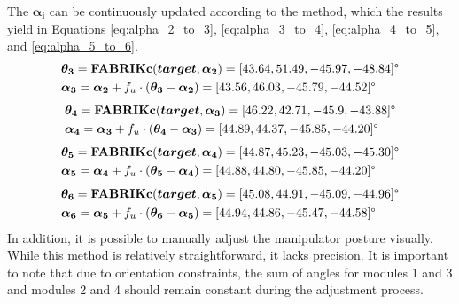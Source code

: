 The $\boldsymbol{\alpha_i}$ can be continuously updated according to the method, which the results yield in Equations 
\ref{eq:alpha_2_to_3}, \ref{eq:alpha_3_to_4}, \ref{eq:alpha_4_to_5}, and \ref{eq:alpha_5_to_6}.
\begin{align}
    &\boldsymbol{\theta_3} = \textbf{FABRIKc}(\boldsymbol{target}, \boldsymbol{\alpha_2}) 
    = [43.64, 51.49, -45.97, -48.84]\degree \nonumber \\
    &\boldsymbol{\alpha_3} = \boldsymbol{\alpha_2} + f_u \cdot (\boldsymbol{\theta_3} - \boldsymbol{\alpha_2}) 
    = [43.56, 46.03, -45.79, -44.52]\degree
    \label{eq:alpha_2_to_3}
\end{align}
\vspace{-18mm}
\begin{align}
    &\boldsymbol{\theta_4} = \textbf{FABRIKc}(\boldsymbol{target}, \boldsymbol{\alpha_3}) 
    = [46.22, 42.71, -45.9, -43.88]\degree \nonumber \\
    &\boldsymbol{\alpha_4} = \boldsymbol{\alpha_3} + f_u \cdot (\boldsymbol{\theta_4} - \boldsymbol{\alpha_3}) 
    = [44.89, 44.37, -45.85, -44.20]\degree
    \label{eq:alpha_3_to_4}
\end{align}
\vspace{-18mm}
\begin{align}
    &\boldsymbol{\theta_5} = \textbf{FABRIKc}(\boldsymbol{target}, \boldsymbol{\alpha_4}) 
    = [44.87, 45.23, -45.03, -45.30]\degree \nonumber \\
    &\boldsymbol{\alpha_5} = \boldsymbol{\alpha_4} + f_u \cdot (\boldsymbol{\theta_5} - \boldsymbol{\alpha_4}) 
    = [44.88, 44.80, -45.85, -44.20]\degree
    \label{eq:alpha_4_to_5}
\end{align}
\vspace{-18mm}
\begin{align}
    &\boldsymbol{\theta_6} = \textbf{FABRIKc}(\boldsymbol{target}, \boldsymbol{\alpha_5}) 
    = [45.08, 44.91, -45.09, -44.96]\degree \nonumber \\
    &\boldsymbol{\alpha_6} = \boldsymbol{\alpha_5} + f_u \cdot (\boldsymbol{\theta_6} - \boldsymbol{\alpha_5}) 
    = [44.94, 44.86, -45.47, -44.58]\degree
    \label{eq:alpha_5_to_6}
\end{align}
\noindent In addition, it is possible to manually adjust the manipulator posture visually. While this method is relatively 
straightforward, it lacks precision. It is important to note that due to orientation constraints, the sum of 
angles for modules 1 and 3 and modules 2 and 4 should remain constant during the adjustment process.

